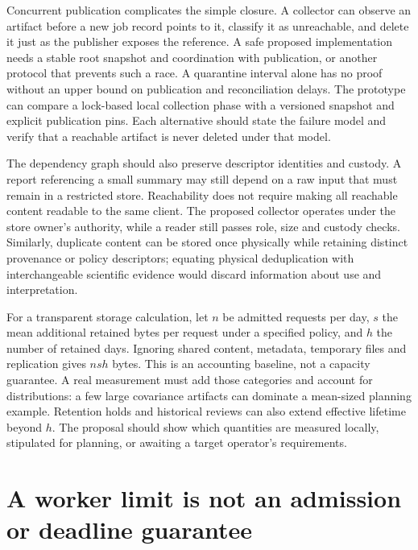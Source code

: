 Concurrent publication complicates the simple closure. A collector can
observe an artifact before a new job record points to it, classify it as
unreachable, and delete it just as the publisher exposes the reference.
A safe proposed implementation needs a stable root snapshot and coordination
with publication, or another protocol that prevents such a race. A
quarantine interval alone has no proof without an upper bound on publication
and reconciliation delays. The prototype can compare a lock-based local
collection phase with a versioned snapshot and explicit publication pins.
Each alternative should state the failure model and verify that a reachable
artifact is never deleted under that model.

The dependency graph should also preserve descriptor identities and custody.
A report referencing a small summary may still depend on a raw input that
must remain in a restricted store. Reachability does not require making all
reachable content readable to the same client. The proposed collector
operates under the store owner's authority, while a reader still passes
role, size and custody checks. Similarly, duplicate content can be stored
once physically while retaining distinct provenance or policy descriptors;
equating physical deduplication with interchangeable scientific evidence
would discard information about use and interpretation.

For a transparent storage calculation, let $n$ be admitted requests per day,
$s$ the mean additional retained bytes per request under a specified policy,
and $h$ the number of retained days. Ignoring shared content, metadata,
temporary files and replication gives $nsh$ bytes. This is an accounting
baseline, not a capacity guarantee. A real measurement must add those
categories and account for distributions: a few large covariance artifacts
can dominate a mean-sized planning example. Retention holds and historical
reviews can also extend effective lifetime beyond $h$. The proposal should
show which quantities are measured locally, stipulated for planning, or
awaiting a target operator's requirements.

\section{A worker limit is not an admission or deadline guarantee}
\label{exec17:i4-capacity}


